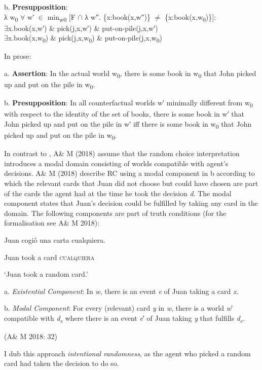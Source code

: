   b.  \textbf{Presupposition}: \\
λ w\textsubscript{0} ${\forall}$ w′ ${\in}$ min\textsubscript{w0} [F ${\cap}$ λ w″. \{x:book(x,w″)\} ${\neq}$ \{x:book(x,w\textsubscript{0})\}]:\\
${\exists}$x.book(x,w′) \& pick(j,x,w′) \& put-on-pile(j,x,w′)\\
${\exists}$x.book(x,w\textsubscript{0}) \& pick(j,x,w\textsubscript{0}) \& put-on-pile(j,x,w\textsubscript{0})

In prose:

  a.  \textbf{Assertion}: In the actual world w\textsubscript{0}, there is some book in w\textsubscript{0} that John picked up and put on the pile in w\textsubscript{0}.

  b.  \textbf{Presupposition}: In all counterfactual worlds w′ minimally different from w\textsubscript{0} with respect to the identity of the set of books, there is some book in w′ that John picked up and put on the pile in w′ iff there is some book in w\textsubscript{0} that John picked up and put on the pile in w\textsubscript{0}.

In contrast to \citealt{ChoiRomero2008}, A\& M (2018) assume that the random choice interpretation introduces a modal domain consisting of worlds compatible with agent’s decisions. A\& M (2018) describe RC using a modal component in b according to which the relevant cards that Juan did not choose but could have chosen are part of the cards the agent had at the time he took the decision \textit{d}. The modal component states that Juan’s decision could be fulfilled by taking any card in the domain. The following components are part of truth conditions (for the formalisation see A\& M 2018):

    Juan  cogió  una  carta  cualquiera.

    Juan  took  a  card \textsc{cualquiera}

    ‘Juan took a random card.’

\label{bkm:Ref150779122}  a.  \textit{Existential Component}: In \textit{w}, there is an event \textit{e} of Juan taking a card \textit{x}.

  b.  \textit{Modal Component}: For every (relevant) card \textit{y} in \textit{w}, there is a world \textit{w}′ compatible with \textit{d\textsubscript{e}} where there is an event \textit{e}′ of Juan taking \textit{y} that fulfills \textit{d\textsubscript{e}}.

    (A\& M 2018: 32)

I dub this approach \textit{intentional randomness}, as the agent who picked a random card had taken the decision to do so. 

